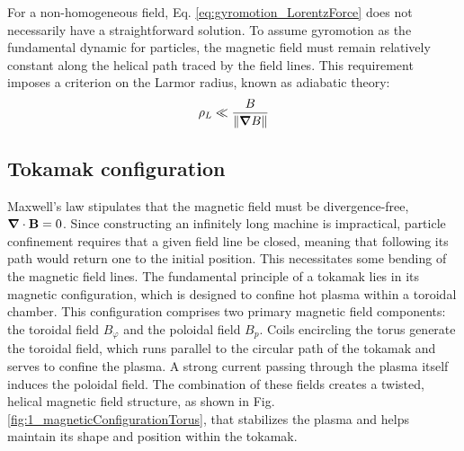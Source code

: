 For a non-homogeneous field, Eq. \ref{eq:gyromotion_LorentzForce} does not necessarily have a straightforward solution. To assume gyromotion as the fundamental dynamic for particles, the magnetic field must remain relatively constant along the helical path traced by the field lines. This requirement imposes a criterion on the Larmor radius, known as adiabatic theory:
\begin{equation}
	\label{eq:intro_adiabaticCondition}
	\rho_L \ll \frac{B}{\norm{\grad B}}
\end{equation}


\subsection{Tokamak configuration}
\label{ssec:intro_tokamakConfiguration}
Maxwell's law stipulates that the magnetic field must be divergence-free, \(\grad\cdot\mathbf{B} = 0\). Since constructing an infinitely long machine is impractical, particle confinement requires that a given field line be closed, meaning that following its path would return one to the initial position. This necessitates some bending of the magnetic field lines. \newline
The fundamental principle of a tokamak lies in its magnetic configuration, which is designed to confine hot plasma within a toroidal chamber. This configuration comprises two primary magnetic field components: the toroidal field \( B_\varphi \) and the poloidal field \( B_p \). Coils encircling the torus generate the toroidal field, which runs parallel to the circular path of the tokamak and serves to confine the plasma. A strong current passing through the plasma itself induces the poloidal field. The combination of these fields creates a twisted, helical magnetic field structure, as shown in Fig. \ref{fig:1_magneticConfigurationTorus}, that stabilizes the plasma and helps maintain its shape and position within the tokamak.


